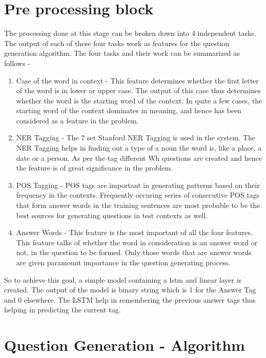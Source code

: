 \section{Pre processing block}

The processing done at this stage can be broken down into 4 independent tasks.
The output of each of these four tasks work as features for the question
generation algorithm. The four tasks and their work can be summarized as follows
-

\begin{enumerate}

\item Case of the word in context - This feature determines whether the first
letter of the word is in lower or upper case. The output of this case thus
determines whether the word is the starting word of the context. In quite a few
cases, the starting word of the context dominates in meaning, and hence has been
considered as a feature in the problem.

\item NER Tagging - The 7 set Stanford NER Tagging is used in the system. The
NER Tagging helps in finding out a type of a noun the word is, like a place, a
date or a person. As per the tag different Wh questions are created and hence
the feature is of great significance in the problem.

\item POS Tagging - POS tags are important in generating patterns based on their
frequency in the contexts. Frequently occuring series of consecutive POS tags
that form answer words in the training sentences are most probable to be the
best sources for generating questions in test contexts as well.

\item Answer Words - This feature is the most important of all the four
features. This feature talks of whether the word in consideration is an answer
word or not, in the question to be formed. Only those words that are answer
words are given paramount importance in the question generating process.

\end{enumerate}

So to achieve this goal, a simple model containing a lstm and linear layer is
created. The output of the model is binary string which is 1 for the Answer Tag
and 0 elsewhere.  The LSTM help in remembering the previous answer tags thus
helping in predicting the current tag.

\section{Question Generation - Algorithm}

